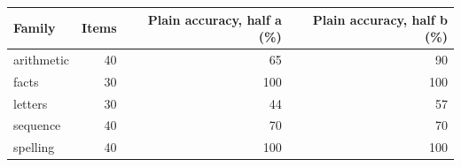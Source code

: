 \begin{tabular}{@{}lrrr@{}}\toprule Family & Items & Plain accuracy, half a (\%) & Plain accuracy, half b (\%) \\ \midrule
arithmetic & 40 & 65 & 90 \\
facts & 30 & 100 & 100 \\
letters & 30 & 44 & 57 \\
sequence & 40 & 70 & 70 \\
spelling & 40 & 100 & 100 \\
\bottomrule\end{tabular}

